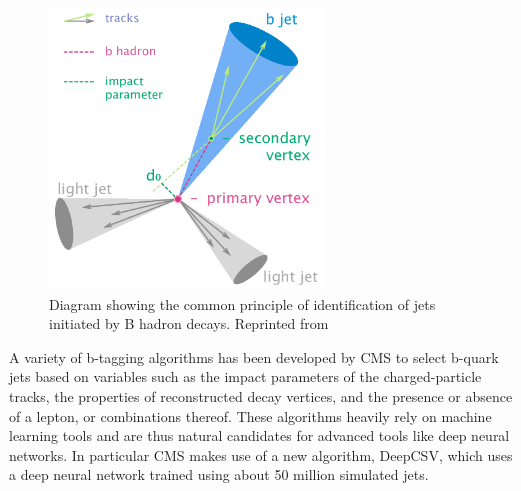 \begin{figure}[h]
 	\centering
 	\includegraphics[width=0.65\textwidth]{figures/Btag.png}
 	\singlespace
 	\caption{Diagram showing the common principle of identification of jets initiated by B hadron decays. Reprinted from \cite{wiki:btag}}
  	\label{fig:btagdia} 	
 \end{figure}

A variety of b-tagging algorithms has been developed by CMS to select b-quark jets\cite{BTV-12-001} based on variables such as the impact parameters of the charged-particle tracks, the properties of reconstructed decay vertices, and the presence or absence of a lepton, or combinations thereof. These algorithms heavily rely on machine learning tools and are thus natural candidates for advanced tools like deep neural networks. In particular CMS makes use of a new algorithm, DeepCSV\cite{Sirunyan_2018, PhysRevD.94.112002}, which uses a deep neural network trained using about 50 million simulated jets. 

